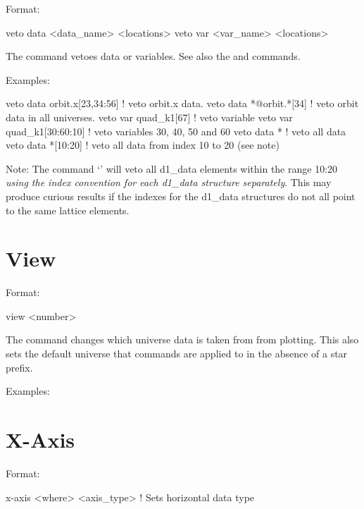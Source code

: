 {{Format:
\begin{example}
  veto data <data_name> <locations>
  veto var <var_name> <locations>
\end{example}

\vskip 0.2in 
The  command vetoes data or variables. See also the
 and  commands.

Examples:
\begin{example}
  veto data orbit.x[23,34:56]  ! veto orbit.x data.
  veto data *@orbit.*[34]      ! veto orbit data in all universes.
  veto var quad_k1[67]         ! veto variable
  veto var quad_k1[30:60:10]   ! veto variables 30, 40, 50 and 60
  veto data *                  ! veto all data
  veto data *[10:20]           ! veto all data from index 10 to 20 (see note)
\end{example}

Note: The command `' will veto all d1\_data elements
within the range 10:20 \textit{using the index convention for each d1\_data
structure separately}. This may produce curious results if the
indexes for the d1\_data structures do not all point to the same lattice
elements. 

\section{View}
\label{s:view}

Format:
\begin{example}
  view <number>
\end{example}

\vskip 0.2in 
The  command changes which universe data is taken from from
plotting.  This also sets the default universe that commands are
applied to in the absence of a star prefix.

Examples:

\section{X-Axis}
\label{s:x-axis}

Format:
\begin{example}
  x-axis <where> <axis_type> ! Sets horizontal data type
\end{example}

}}
